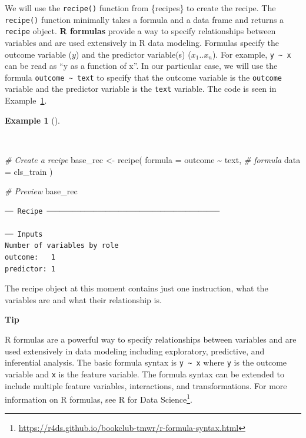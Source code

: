 \documentclass[
  letterpaper,
  krantz1]{latex/krantz-mod}
\newenvironment{Shaded}{\begin{snugshade}}{\end{snugshade}}
\newcommand{\AttributeTok}[1]{\textcolor[rgb]{0.00,0.00,0.00}{#1}}
\newcommand{\CommentTok}[1]{\textcolor[rgb]{0.00,0.00,0.00}{\textit{#1}}}
\newcommand{\FunctionTok}[1]{\textcolor[rgb]{0.00,0.00,0.00}{#1}}
\newcommand{\NormalTok}[1]{\textcolor[rgb]{0.00,0.00,0.00}{#1}}
\newcommand{\OtherTok}[1]{\textcolor[rgb]{0.00,0.00,0.00}{#1}}
\newcommand{\SpecialCharTok}[1]{\textcolor[rgb]{0.00,0.00,0.00}{#1}}
\theoremstyle{definition}
\newtheorem{example}{Example}[chapter]
\theoremstyle{definition}
\theoremstyle{remark}
\DeclareRobustCommand{\href}[2]{#2\footnote{\url{#1}}}
\begin{document}
We will use the \texttt{recipe()} function from \{recipes\} to create
the recipe. The \texttt{recipe()} function minimally takes a formula and
a data frame and returns a \texttt{recipe} object. \textbf{R formulas}
provide a way to specify relationships between variables and are used
extensively in R data modeling. Formulas specify the outcome variable
(\(y\)) and the predictor variable(s) (\(x_1 .. x_n\)). For example,
\texttt{y\ \textasciitilde{}\ x} can be read as ``y as a function of
x''. In our particular case, we will use the formula
\texttt{outcome\ \textasciitilde{}\ text} to specify that the outcome
variable is the \texttt{outcome} variable and the predictor variable is
the \texttt{text} variable. The code is seen in
Example~\ref{exm-predict-class-recipe}.

\begin{example}[]\protect\hypertarget{exm-predict-class-recipe}{}\label{exm-predict-class-recipe}

~

\begin{Shaded}
\begin{Highlighting}[numbers=left,,]
\CommentTok{\# Create a recipe}
\NormalTok{base\_rec }\OtherTok{\textless{}{-}}
  \FunctionTok{recipe}\NormalTok{(}
    \AttributeTok{formula =}\NormalTok{ outcome }\SpecialCharTok{\textasciitilde{}}\NormalTok{ text, }\CommentTok{\# formula}
    \AttributeTok{data =}\NormalTok{ cls\_train}
\NormalTok{    )}

\CommentTok{\# Preview}
\NormalTok{base\_rec}
\end{Highlighting}
\end{Shaded}

\begin{verbatim}
── Recipe ─────────────────────────────────────────

── Inputs
Number of variables by role
outcome:   1
predictor: 1
\end{verbatim}

\end{example}

The recipe object at this moment contains just one instruction, what the
variables are and what their relationship is.

\begin{tcolorbox}[enhanced jigsaw, leftrule=.75mm, colframe=quarto-callout-color-frame, left=2mm, colback=white, toprule=.15mm, breakable, arc=.35mm, opacityback=0, bottomrule=.15mm, rightrule=.15mm]

\textbf{ Tip}

R formulas are a powerful way to specify relationships between variables
and are used extensively in data modeling including exploratory,
predictive, and inferential analysis. The basic formula syntax is
\texttt{y\ \textasciitilde{}\ x} where \texttt{y} is the outcome
variable and \texttt{x} is the feature variable. The formula syntax can
be extended to include multiple feature variables, interactions, and
transformations. For more information on R formulas, see
\href{https://r4ds.github.io/bookclub-tmwr/r-formula-syntax.html}{R for
Data Science}.

\end{tcolorbox}
\end{document}
